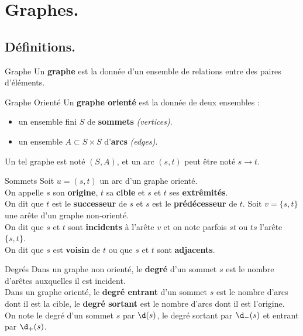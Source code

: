 \documentclass[french, 11pt]{article}
\begin{document}


\section{Graphes.}
\subsection{Définitions.}

\begin{defi}{Graphe}{}
    Un \textbf{graphe} est la donnée d'un ensemble de relations entre des paires d'éléments.
\end{defi}

\vspace*{-0.5cm}

\begin{defi}{Graphe Orienté}{}
    Un \textbf{graphe orienté} est la donnée de deux ensembles :
    \begin{itemize}
        \item un ensemble fini $S$ de \textbf{sommets} \textit{(vertices)}.
        \item un ensemble $A\subset S\times S$ d'\textbf{arcs} \textit{(edges)}.
    \end{itemize}
    Un tel graphe est noté $(S,A)$, et un arc $(s,t)$ peut être noté $s\to t$.
\end{defi}

\begin{nota}{Sommets}{}
    Soit $u=(s,t)$ un arc d'un graphe orienté.\\
    On appelle $s$ son \textbf{origine}, $t$ sa \textbf{cible} et $s$ et $t$ ses \textbf{extrêmités}.\\
    On dit que $t$ est le \textbf{successeur} de $s$ et $s$ est le \textbf{prédécesseur} de $t$.\n
    Soit $v=\{s,t\}$ une arête d'un graphe non-orienté.\\
    On dit que $s$ et $t$ sont \textbf{incidents} à l'arête $v$ et on note parfois $st$ ou $ts$ l'arête $\{s,t\}$.\\
    On dit que $s$ est \textbf{voisin} de $t$ ou que $s$ et $t$ sont \textbf{adjacents}.
\end{nota}

\vspace*{-0.8cm}

\begin{defi}{Degrés}{}
    Dans un graphe non orienté, le \textbf{degré} d'un sommet $s$ est le nombre d'arêtes auxquelles il est incident.\\
    Dans un graphe orienté, le \textbf{degré entrant} d'un sommet $s$ est le nombre d'arcs dont il est la cible, le \textbf{degré sortant} est le nombre d'arcs dont il est l'origine.\\
    On note le degré d'un sommet $s$ par $\d(s)$, le degré sortant par $\d_-(s)$ et entrant par $\d_+(s)$.
\end{defi}
\end{document}
